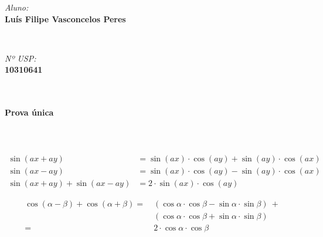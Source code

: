 \begin{minipage}{0.52\textwidth}
\begin{flushleft} \large
\emph{Aluno:}\\
\textbf{Luís Filipe Vasconcelos Peres} %
\end{flushleft}
\end{minipage}
~
\begin{minipage}{0.45\textwidth}
\begin{flushright} \large
\emph{Nº USP:} \\
\textbf{10310641} %
\end{flushright}
\end{minipage}\\

\center
\HRule \\[0.4cm]
{ \LARGE \bfseries Prova única}\\ %
\HRule \\[0.2cm]

\justify
\section{}

    
\appendix
\appendixpage

\begin{equation}
    \begin{split}
        \sin(ax + ay) & = \sin(ax) \cdot \cos(ay) + \sin(ay) \cdot \cos(ax)\\
        \sin(ax - ay) & = \sin(ax) \cdot \cos(ay) - \sin(ay) \cdot \cos(ax)\\
        \sin(ax + ay) + \sin(ax - ay) & = 2 \cdot \sin(ax) \cdot \cos(ay)    
    \end{split}
\end{equation}

\begin{equation}\label{eq:2}
    \begin{split}
        \cos( \alpha - \beta ) + \cos( \alpha + \beta ) = &~(\cos\alpha \cdot \cos\beta - \sin\alpha \cdot \sin\beta) ~+ \\
        &~ (\cos\alpha \cdot \cos\beta + \sin\alpha \cdot \sin\beta)\\
        = & ~2 \cdot \cos\alpha \cdot \cos\beta
    \end{split}
\end{equation}

